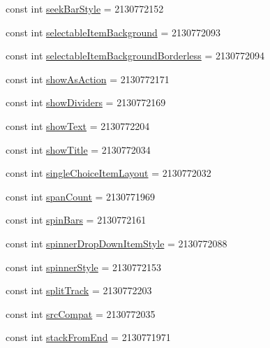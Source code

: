 \begin{CompactItemize}
\item 
const int \hyperlink{class__2doo_1_1_droid_1_1_resource_1_1_attribute_f8e82291c56a60c8bc33a0dd4ae609f5}{seekBarStyle} = 2130772152
\item 
const int \hyperlink{class__2doo_1_1_droid_1_1_resource_1_1_attribute_d3c8bd4352b7dfa314b1342730484496}{selectableItemBackground} = 2130772093
\item 
const int \hyperlink{class__2doo_1_1_droid_1_1_resource_1_1_attribute_f5f6ebf2109f94e9bb5dbb89bdca2e24}{selectableItemBackgroundBorderless} = 2130772094
\item 
const int \hyperlink{class__2doo_1_1_droid_1_1_resource_1_1_attribute_09e27a27d8ccc11b4a5c936a41ee6c42}{showAsAction} = 2130772171
\item 
const int \hyperlink{class__2doo_1_1_droid_1_1_resource_1_1_attribute_fbc5f9798afb8db42cd6f3596c0e0d2f}{showDividers} = 2130772169
\item 
const int \hyperlink{class__2doo_1_1_droid_1_1_resource_1_1_attribute_74c08dce091c393cc7d068b16d300931}{showText} = 2130772204
\item 
const int \hyperlink{class__2doo_1_1_droid_1_1_resource_1_1_attribute_8e1f8bfceaaf74e067c18bfaa39bcf00}{showTitle} = 2130772034
\item 
const int \hyperlink{class__2doo_1_1_droid_1_1_resource_1_1_attribute_d0c01028ee3b08279ee76b3e8236a5bf}{singleChoiceItemLayout} = 2130772032
\item 
const int \hyperlink{class__2doo_1_1_droid_1_1_resource_1_1_attribute_5f7dfefb5dac4c2a7be7b198e8bfcf49}{spanCount} = 2130771969
\item 
const int \hyperlink{class__2doo_1_1_droid_1_1_resource_1_1_attribute_cd0fff652fc3ab436bd733dffa433377}{spinBars} = 2130772161
\item 
const int \hyperlink{class__2doo_1_1_droid_1_1_resource_1_1_attribute_f1e9d5371b9a94f17ad9a12720ce92e0}{spinnerDropDownItemStyle} = 2130772088
\item 
const int \hyperlink{class__2doo_1_1_droid_1_1_resource_1_1_attribute_053d98126e08392fe187a9eb649d9ecf}{spinnerStyle} = 2130772153
\item 
const int \hyperlink{class__2doo_1_1_droid_1_1_resource_1_1_attribute_4d153775c75187c30e750002e480dec0}{splitTrack} = 2130772203
\item 
const int \hyperlink{class__2doo_1_1_droid_1_1_resource_1_1_attribute_46aea96506ddc33d8aaa3bdd08c2a3d1}{srcCompat} = 2130772035
\item 
const int \hyperlink{class__2doo_1_1_droid_1_1_resource_1_1_attribute_3981901a848c8faac44512e03a50bb3e}{stackFromEnd} = 2130771971

\end{CompactItemize}
